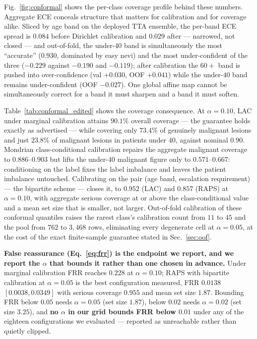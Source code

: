 \documentclass[journal]{IEEEtran}
\begin{document}
Fig.~\ref{fig:conformal} shows the per-class coverage profile behind these numbers. Aggregate ECE conceals structure that matters for calibration and for coverage alike. Sliced by
age band on the deployed TTA ensemble, the per-band ECE spread is $0.084$ before Dirichlet
calibration and $0.029$ after --- narrowed, not closed --- and out-of-fold, the under-$40$ band
is simultaneously the most ``accurate'' ($0.930$, dominated by easy nevi) and the most
under-confident of the three ($-0.229$ against $-0.190$ and $-0.119$); after calibration the
$60+$ band is pushed into over-confidence (val $+0.030$, OOF $+0.041$) while the under-$40$
band remains under-confident (OOF $-0.027$). One global affine map cannot be simultaneously
correct for a band it must sharpen and a band it must soften.

Table~\ref{tab:conformal_edited} shows the coverage consequence. At $\alpha=0.10$, LAC under
marginal calibration attains $90.1\%$ overall coverage --- the guarantee holds exactly as
advertised --- while covering only $73.4\%$ of genuinely malignant lesions and just $23.8\%$
of malignant lesions in patients under $40$, against nominal $0.90$. Mondrian
class-conditional calibration repairs the aggregate malignant coverage to $0.886$--$0.903$ but
lifts the under-$40$ malignant figure only to $0.571$--$0.667$: conditioning on the label
fixes the label imbalance and leaves the patient imbalance untouched. Calibrating on the pair
(age band, escalation requirement) --- the bipartite scheme --- closes it, to $0.952$ (LAC)
and $0.857$ (RAPS) at $\alpha=0.10$, with aggregate serious coverage at or above the
class-conditional value and a mean set size that is smaller, not larger. Out-of-fold
calibration of these conformal quantiles raises the rarest class's calibration count from $11$
to $45$ and the pool from $762$ to $3{,}468$ rows, eliminating every degenerate cell at
$\alpha=0.05$, at the cost of the exact finite-sample guarantee stated in
Sec.~\ref{sec:oof}.

\textbf{False reassurance (Eq.~\eqref{eq:frr}) is the endpoint we report, and we report the
$\alpha$ that bounds it
rather than one chosen in advance.} Under marginal calibration FRR reaches $0.228$ at
$\alpha=0.10$; RAPS with bipartite calibration at $\alpha=0.05$ is the best configuration
measured, FRR $0.0138$ $[0.0038, 0.0349]$ with serious coverage $0.955$ and mean set size
$1.87$. Bounding FRR below $0.05$ needs $\alpha=0.05$ (set size $1.87$), below $0.02$ needs
$\alpha=0.02$ (set size $3.25$), and \textbf{no $\alpha$ in our grid bounds FRR below $0.01$}
under any of the eighteen configurations we evaluated --- reported as unreachable rather than
quietly clipped.
\end{document}
